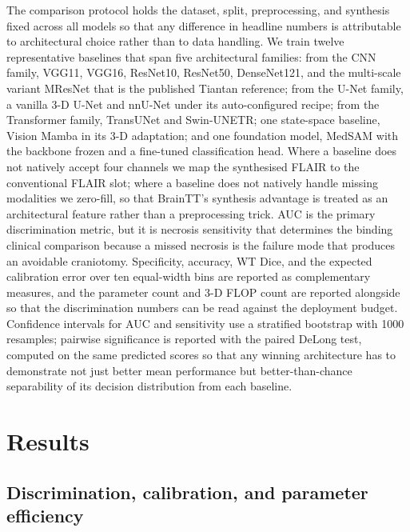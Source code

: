 \documentclass[11pt,a4paper]{article}
\begin{document}
The comparison protocol holds the dataset, split, preprocessing, and synthesis fixed across all models so that any difference in headline numbers is attributable to architectural choice rather than to data handling. We train twelve representative baselines that span five architectural families: from the CNN family, VGG11, VGG16, ResNet10, ResNet50, DenseNet121, and the multi-scale variant MResNet that is the published Tiantan reference; from the U-Net family, a vanilla 3-D U-Net and nnU-Net under its auto-configured recipe; from the Transformer family, TransUNet and Swin-UNETR; one state-space baseline, Vision Mamba in its 3-D adaptation; and one foundation model, MedSAM with the backbone frozen and a fine-tuned classification head. Where a baseline does not natively accept four channels we map the synthesised FLAIR to the conventional FLAIR slot; where a baseline does not natively handle missing modalities we zero-fill, so that BrainTT's synthesis advantage is treated as an architectural feature rather than a preprocessing trick. AUC is the primary discrimination metric, but it is necrosis sensitivity that determines the binding clinical comparison because a missed necrosis is the failure mode that produces an avoidable craniotomy. Specificity, accuracy, WT Dice, and the expected calibration error over ten equal-width bins are reported as complementary measures, and the parameter count and 3-D FLOP count are reported alongside so that the discrimination numbers can be read against the deployment budget. Confidence intervals for AUC and sensitivity use a stratified bootstrap with 1000 resamples; pairwise significance is reported with the paired DeLong test, computed on the same predicted scores so that any winning architecture has to demonstrate not just better mean performance but better-than-chance separability of its decision distribution from each baseline.

\section{Results}

\subsection{Discrimination, calibration, and parameter efficiency}
\end{document}
